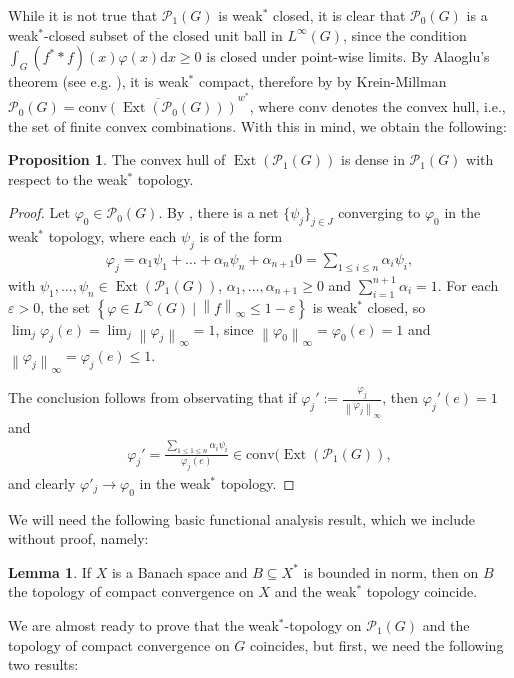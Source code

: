 \documentclass[10pt,twoside,openany,final]{memoir}
\theoremstyle{definition}
\newtheorem{lemma}[theorem]{Lemma}
\newtheorem{proposition}[theorem]{Proposition}
\theoremstyle{Break}
\newcommand{\lv}{\left\lVert}
\newcommand{\rv}{\right\rVert}
\renewcommand{\P}{\mathcal{P}}
\DeclareMathOperator{\Ext}{Ext}
\renewcommand{\d}{\mathrm{d}}
\begin{document}
While it is not true that $\P_1(G)$ is weak$^*$ closed, it is clear that $\P_0(G)$ is a weak$^*$-closed subset of the closed unit ball in $L^\infty(G)$, since the condition $\int_G (f^* \ast f)(x) \varphi(x) \d x\geq 0$ is closed under point-wise limits. By Alaoglu's theorem (see e.g. \cite[68]{rudin1991functional}), it is weak$^*$ compact, therefore by by Krein-Millman $\P_0(G)=\overline{\mathrm{conv}(\Ext(\P_0(G)))}^{w^*}$, where $\mathrm{conv}$ denotes the convex hull, i.e., the set of finite convex combinations. With this in mind, we obtain the following:
\begin{proposition}
	The convex hull of $\Ext(\P_1(G))$ is dense in $\P_1(G)$ with respect to the weak$^*$ topology.
	\label{3.27}
\end{proposition}
\begin{proof}
	Let $\varphi_0 \in \P_0(G)$. By , there is a net $\{\psi_j\}_{j \in J}$ converging to $\varphi_0$ in the weak$^*$ topology, where each $\psi_j$ is of the form
	\begin{align*}
		\varphi_j=\alpha_1 \psi_1+\dots+\alpha_n \psi_n + \alpha_{n+1}0=\sum_{1 \leq i \leq n}\alpha_i \psi_i, 
	\end{align*}
	with $\psi_1,\dots,\psi_n \in \Ext(\P_1(G))$, $\alpha_1,\dots,\alpha_{n+1}\geq 0$ and $\sum_{i=1}^{n+1}\alpha_i = 1$. For each $\varepsilon>0$, the set $\left\{ \varphi \in L^\infty(G) \ \big| \ \lv f \rv_\infty \leq 1-\varepsilon \right\}$ is weak$^*$ closed, so $\lim_j \varphi_j(e)=\lim_j \lv \varphi_j \rv_{\infty}=1$, since $\lv \varphi_0 \rv_\infty= \varphi_0(e)=1$ and $\lv \varphi_j \rv_\infty=\varphi_j(e)\leq 1$.

	The conclusion follows from observating that if $\varphi_j':=\frac{\varphi_j}{\lv \varphi_j\rv_\infty}$, then $\varphi_j'(e)=1$ and 
	\begin{align*}
		\varphi_j'=\frac{\sum_{1 \leq 1 \leq n}\alpha_i \psi_i}{\varphi_j(e)} \in \mathrm{conv}(\Ext(\P_1(G)),
	\end{align*}
	and clearly $\varphi'_j \to \varphi_0$ in the weak$^*$ topology.
\end{proof}
We will need the following basic functional analysis result, which we include without proof, namely:
\begin{lemma}
	If $X$ is a Banach space and $B \subseteq X^*$ is bounded in norm, then on $B$ the topology of compact convergence on $X$ and the weak$^*$ topology coincide.
	\label{3.28}
\end{lemma}
We are almost ready to prove that the weak$^*$-topology on $\P_1(G)$ and the topology of compact convergence on $G$ coincides, but first, we need the following two results:
\end{document}
